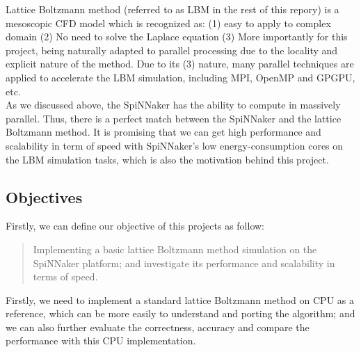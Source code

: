 Lattice Boltzmann method (referred to as LBM in the rest of this repory) is a mesoscopic CFD model which is recognized\cite{lbmmbook} as: (1) easy to apply to complex domain (2) No need to solve the Laplace equation (3) More importantly for this project, being naturally adapted to parallel processing due to the locality and explicit nature of the method. Due to its (3) nature, many parallel techniques are applied to accelerate the LBM simulation, including MPI\cite{he1999three}, OpenMP\cite{massaioli2002achieving} and GPGPU\cite{rogers1990upwind}, etc. \\

As we discussed above, the SpiNNaker has the ability to compute in massively parallel. Thus, there is a perfect match between the SpiNNaker and the lattice Boltzmann method. It is promising that we can get high performance and scalability in term of speed with SpiNNaker's low energy-consumption cores on the LBM simulation tasks, which is also the motivation behind this project.  \\




\subsection{Objectives} \label{sec:Obj}

Firstly, we can define our objective of this projects as follow:\\

\begin{quote}
Implementing a basic lattice Boltzmann method simulation on the SpiNNaker platform; and investigate its  performance and scalability in terms of speed. \\
\end{quote}



Firstly, we need to implement a standard lattice Boltzmann method on CPU as a reference, which can be more easily to understand and porting the algorithm; and we can also further evaluate the correctness, accuracy and compare the performance with this CPU implementation.\\

